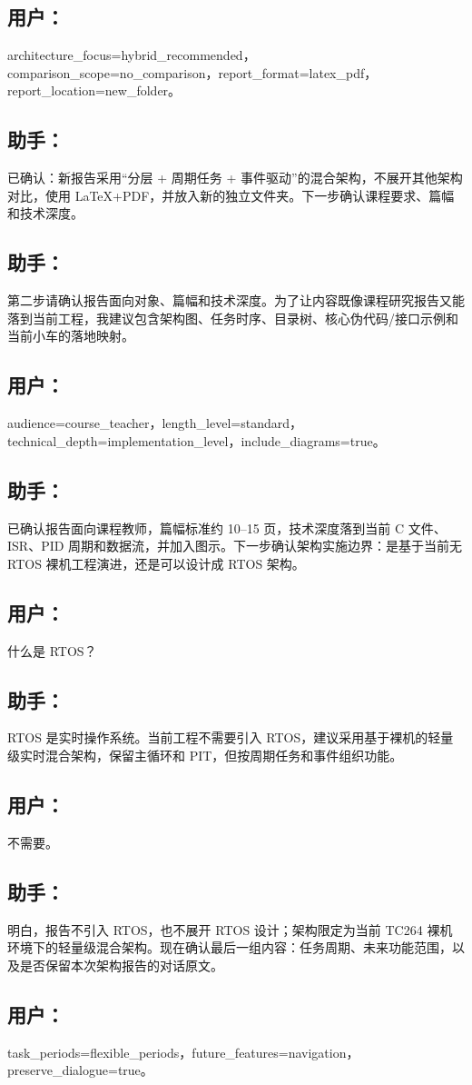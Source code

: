 \documentclass[11pt,a4paper,fontset=fandol]{ctexart}
\begin{document}
\subsection*{用户：}
architecture\_focus=hybrid\_recommended，comparison\_scope=no\_comparison，report\_format=latex\_pdf，report\_location=new\_folder。

\subsection*{助手：}
已确认：新报告采用“分层 + 周期任务 + 事件驱动”的混合架构，不展开其他架构对比，使用 LaTeX+PDF，并放入新的独立文件夹。下一步确认课程要求、篇幅和技术深度。

\subsection*{助手：}
第二步请确认报告面向对象、篇幅和技术深度。为了让内容既像课程研究报告又能落到当前工程，我建议包含架构图、任务时序、目录树、核心伪代码/接口示例和当前小车的落地映射。

\subsection*{用户：}
audience=course\_teacher，length\_level=standard，technical\_depth=implementation\_level，include\_diagrams=true。

\subsection*{助手：}
已确认报告面向课程教师，篇幅标准约 10--15 页，技术深度落到当前 C 文件、ISR、PID 周期和数据流，并加入图示。下一步确认架构实施边界：是基于当前无 RTOS 裸机工程演进，还是可以设计成 RTOS 架构。

\subsection*{用户：}
什么是 RTOS？

\subsection*{助手：}
RTOS 是实时操作系统。当前工程不需要引入 RTOS，建议采用基于裸机的轻量级实时混合架构，保留主循环和 PIT，但按周期任务和事件组织功能。

\subsection*{用户：}
不需要。

\subsection*{助手：}
明白，报告不引入 RTOS，也不展开 RTOS 设计；架构限定为当前 TC264 裸机环境下的轻量级混合架构。现在确认最后一组内容：任务周期、未来功能范围，以及是否保留本次架构报告的对话原文。

\subsection*{用户：}
task\_periods=flexible\_periods，future\_features=navigation，preserve\_dialogue=true。
\end{document}
